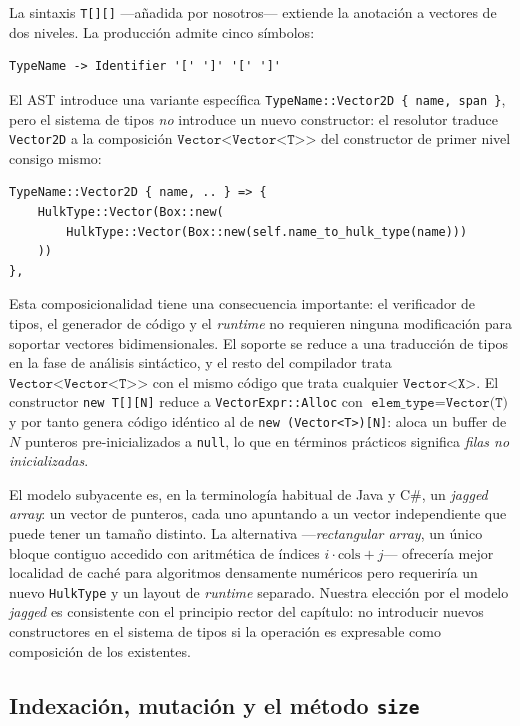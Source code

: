 \documentclass[11pt,a4paper,oneside,openany]{report}
\newcommand{\code}[1]{\texttt{#1}}
\begin{document}
La sintaxis \code{T[][]} ---añadida por nosotros--- extiende la anotación
a vectores de dos niveles. La producción admite cinco símbolos:

\begin{lstlisting}[style=bnf]
TypeName -> Identifier '[' ']' '[' ']'
\end{lstlisting}

El AST introduce una variante específica \code{TypeName::Vector2D \{ name,
span \}}, pero el sistema de tipos \emph{no} introduce un nuevo
constructor: el resolutor traduce \code{Vector2D} a la composición
$\code{Vector<Vector<T>>}$ del constructor de primer nivel consigo mismo:

\begin{lstlisting}[style=rustst]
TypeName::Vector2D { name, .. } => {
    HulkType::Vector(Box::new(
        HulkType::Vector(Box::new(self.name_to_hulk_type(name)))
    ))
},
\end{lstlisting}

Esta composicionalidad tiene una consecuencia importante: el verificador
de tipos, el generador de código y el \textit{runtime} no requieren
ninguna modificación para soportar vectores bidimensionales. El soporte se
reduce a una traducción de tipos en la fase de análisis sintáctico, y el
resto del compilador trata $\code{Vector<Vector<T>>}$ con el mismo código
que trata cualquier $\code{Vector<X>}$. El constructor \code{new T[][N]}
reduce a \code{VectorExpr::Alloc} con $\code{elem\_type} = \code{Vector(T)}$
y por tanto genera código idéntico al de \code{new (Vector<T>)[N]}: aloca
un buffer de $N$ punteros pre-inicializados a \code{null}, lo que en
términos prácticos significa \emph{filas no inicializadas}.

El modelo subyacente es, en la terminología habitual de Java y C\#, un
\emph{jagged array}: un vector de punteros, cada uno apuntando a un vector
independiente que puede tener un tamaño distinto. La alternativa
---\emph{rectangular array}, un único bloque contiguo accedido con
aritmética de índices $i \cdot \text{cols} + j$--- ofrecería mejor
localidad de caché para algoritmos densamente numéricos pero requeriría
un nuevo \code{HulkType} y un layout de \textit{runtime} separado. Nuestra
elección por el modelo \emph{jagged} es consistente con el principio
rector del capítulo: no introducir nuevos constructores en el sistema de
tipos si la operación es expresable como composición de los existentes.

\subsection{Indexación, mutación y el método \code{size}}
\end{document}
